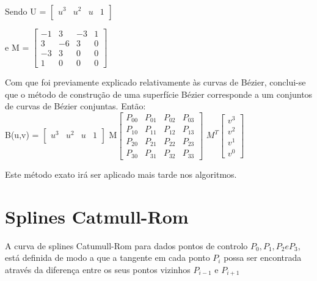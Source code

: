 Sendo U = $\begin{bmatrix}
       u^{3} & u^{2} & u & 1          \\[0.3em]
		\end{bmatrix}$

e M = $\begin{bmatrix}
		       -1 & 3 & -3  & 1           \\[0.3em]
		        3 & -6 &  3 & 0   \\[0.3em]
		       -3 & 3 & 0 & 0 \\[0.3em]
		       1 & 0 & 0 & 0
		     \end{bmatrix}$

Com que foi previamente explicado relativamente às curvas de Bézier, conclui-se
que o método de construção de uma superfície Bézier corresponde a um conjuntos
de curvas de Bézier conjuntas. 
Então:
\begin{equation}
	
	\label{}
\end{equation}
B(u,v) = $\begin{bmatrix}
       u^{3} & u^{2} & u & 1          \\[0.3em]
		\end{bmatrix}$ 
		M$\begin{bmatrix}
		       P_{00} & P_{01} & P_{02} & P_{03}   \\[0.3em]
		       P_{10} & P_{11} & P_{12} & P_{13}   \\[0.3em]
		       P_{20} & P_{21} & P_{22} & P_{23}   \\[0.3em]
		       P_{30} & P_{31} & P_{32} & P_{33}
		     \end{bmatrix}$
		$M^{T} \begin{bmatrix}
		       v^{3}           \\[0.3em]
		       v^{2}   \\[0.3em]
		       v^{1} \\[0.3em]
		       v^{0}
		     \end{bmatrix}$

Este método exato irá ser aplicado mais tarde nos algoritmos.
\section{Splines Catmull-Rom}

A curva de splines Catumull-Rom para dados pontos de controlo $P_{0}, P_{1}, P_{2} e P_{3}$, está definida de modo a que a tangente em cada ponto $P_{i}$ possa ser encontrada através da diferença entre os seus pontos vizinhos $P_{i-1}$ e $P_{i+1}$

